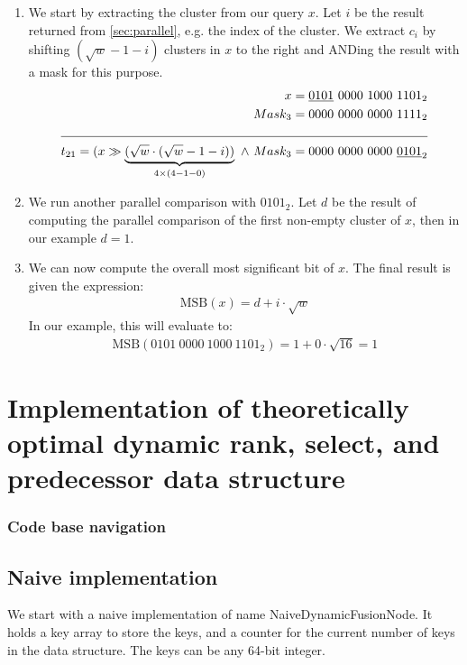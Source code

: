 \begin{enumerate}
    \item
    We start by extracting the cluster from our query $x$. Let $i$ be the result returned from \ref{sec:parallel}, e.g. the index of the cluster. We extract $c_i$ by shifting $(\sqrt{w} - 1 - i)$ clusters in $x$ to the right and ANDing the result with a mask for this purpose.
    \begin{align*}
        x = \underline{0101}\ 0000\ 1000\ 1101_2 &\\
        Mask_3 = 0000\ 0000\ 0000\ 1111_2 &\\
        \cline{1-2}
        t_{21} = (x \gg \underbrace{(\sqrt{w} \cdot (\sqrt{w} - 1 - i))}_{4\times(4-1-0)}\ \wedge\ Mask_3 = 0000\ 0000\ 0000\ \underline{0101}_2 &
    \end{align*}
    \item
    We run another parallel comparison with $0101_2$. Let $d$ be the result of computing the parallel comparison of the first non-empty cluster of $x$, then in our example $d = 1$.
    \item
    We can now compute the overall most significant bit of $x$. The final result is given the expression:
    \begin{align*}
        \text{MSB}(x) = d + i\cdot\sqrt{w}
    \end{align*}
    In our example, this will evaluate to:
    \begin{align*}
        \text{MSB}(0101\ 0000\ 1000\ 1101_2) = 1 + 0\cdot\sqrt{16} = 1
    \end{align*}
\end{enumerate}

\chapter{Implementation of theoretically optimal dynamic rank, select, and predecessor data structure}

\subsection{Code base navigation}

\section{Naive implementation}
We start with a naive implementation of name {\ttfamily NaiveDynamicFusionNode}. It holds a {\ttfamily key} array to store the keys, and a counter for the current number of keys in the data structure. The keys can be any 64-bit integer.

